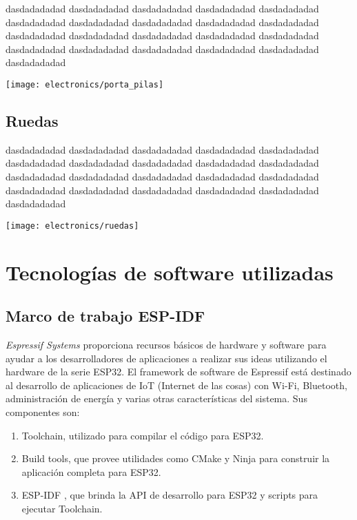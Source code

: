dasdadadadad dasdadadadad dasdadadadad dasdadadadad dasdadadadad dasdadadadad dasdadadadad dasdadadadad dasdadadadad dasdadadadad dasdadadadad dasdadadadad dasdadadadad dasdadadadad dasdadadadad dasdadadadad dasdadadadad dasdadadadad dasdadadadad dasdadadadad dasdadadadad 

\begin{center}
    \centering
    \texttt{[image: electronics/porta\_pilas]}
    \label{fig:porta_pilas}
\end{center}

\subsection{Ruedas}

dasdadadadad dasdadadadad dasdadadadad dasdadadadad dasdadadadad dasdadadadad dasdadadadad dasdadadadad dasdadadadad dasdadadadad dasdadadadad dasdadadadad dasdadadadad dasdadadadad dasdadadadad dasdadadadad dasdadadadad dasdadadadad dasdadadadad dasdadadadad dasdadadadad 

\begin{center}
    \centering
    \texttt{[image: electronics/ruedas]}
    \label{fig:ruedas}
\end{center}

\section{Tecnologías de software utilizadas} 

\subsection{Marco de trabajo ESP-IDF}

\textit{Espressif Systems} proporciona recursos básicos de hardware y software para ayudar a los desarrolladores de aplicaciones a realizar sus ideas utilizando el hardware de la serie ESP32. El framework de software de Espressif está destinado al desarrollo de aplicaciones de IoT (Internet de las cosas) con Wi-Fi, Bluetooth, administración de energía y varias otras características del sistema.
Sus componentes son:
\begin{enumerate}
	\item Toolchain, utilizado para compilar el código para ESP32.
	\item Build tools, que provee utilidades como CMake \cite{cmake_website} y Ninja \cite{ninja_website} para construir la aplicación completa para ESP32.
	\item ESP-IDF \cite{ESPIDF_home}, que brinda la API de desarrollo para ESP32 y scripts para ejecutar Toolchain.
	
\end{enumerate}

